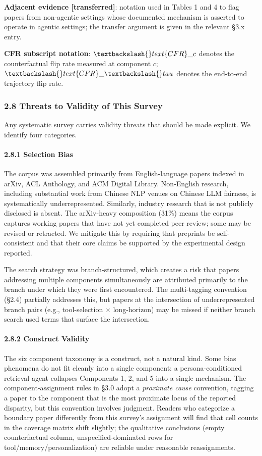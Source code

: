 \documentclass[10pt]{article}
\begin{document}
\textbf{Adjacent evidence [transferred]}: notation used in Tables 1 and 4 to flag papers from non-agentic settings whose documented mechanism is asserted to operate in agentic settings; the transfer argument is given in the relevant \S{}3.x entry.

\textbf{CFR subscript notation}: $\textbackslash\{\}text\{CFR\}\_c$ denotes the counterfactual flip rate measured at component $c$; $\textbackslash\{\}text\{CFR\}\_\textbackslash\{\}tau$ denotes the end-to-end trajectory flip rate.


\subsubsection*{2.8 Threats to Validity of This Survey}

Any systematic survey carries validity threats that should be made explicit. We identify four categories.

\paragraph*{2.8.1 Selection Bias}

The corpus was assembled primarily from English-language papers indexed in arXiv, ACL Anthology, and ACM Digital Library. Non-English research, including substantial work from Chinese NLP venues on Chinese LLM fairness, is systematically underrepresented. Similarly, industry research that is not publicly disclosed is absent. The arXiv-heavy composition (31\%) means the corpus captures working papers that have not yet completed peer review; some may be revised or retracted. We mitigate this by requiring that preprints be self-consistent and that their core claims be supported by the experimental design reported.

The search strategy was branch-structured, which creates a risk that papers addressing multiple components simultaneously are attributed primarily to the branch under which they were first encountered. The multi-tagging convention (\S{}2.4) partially addresses this, but papers at the intersection of underrepresented branch pairs (e.g., tool-selection $\times$ long-horizon) may be missed if neither branch search used terms that surface the intersection.

\paragraph*{2.8.2 Construct Validity}

The six component taxonomy is a construct, not a natural kind. Some bias phenomena do not fit cleanly into a single component: a persona-conditioned retrieval agent collapses Components 1, 2, and 5 into a single mechanism. The component-assignment rules in \S{}3.0 adopt a \emph{proximate cause} convention, tagging a paper to the component that is the most proximate locus of the reported disparity, but this convention involves judgment. Readers who categorize a boundary paper differently from this survey's assignment will find that cell counts in the coverage matrix shift slightly; the qualitative conclusions (empty counterfactual column, unspecified-dominated rows for tool/memory/personalization) are reliable under reasonable reassignments.
\end{document}
